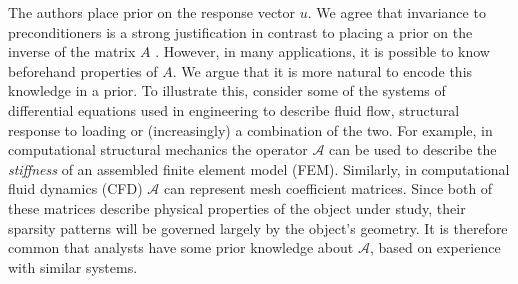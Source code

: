 \documentclass[twoside]{article}
\begin{document}
		The authors place prior on the response vector $u$. We agree that invariance to preconditioners is a strong justification in contrast to placing a prior on the inverse of the matrix $A$  \cite{Hen15}. However, in many applications, it is possible to know beforehand properties of $A$. We argue that it is more natural to encode this knowledge in a prior. %
		To illustrate this, consider some of the systems of differential equations %
		used in engineering to describe fluid flow, structural response to loading or (increasingly) a combination of the two. %
		For example, in computational structural mechanics the operator $\mathcal{A}$ can be used to describe the \textit{stiffness} of an assembled finite element model (FEM). Similarly, in computational fluid dynamics (CFD) $\mathcal{A}$ can represent mesh coefficient matrices. Since both of these matrices describe physical properties of the object under study, their sparsity patterns will be governed largely by the object's geometry. It is therefore common that analysts have some prior knowledge about $\mathcal{A}$, based on experience with similar systems.
		
\end{document}
